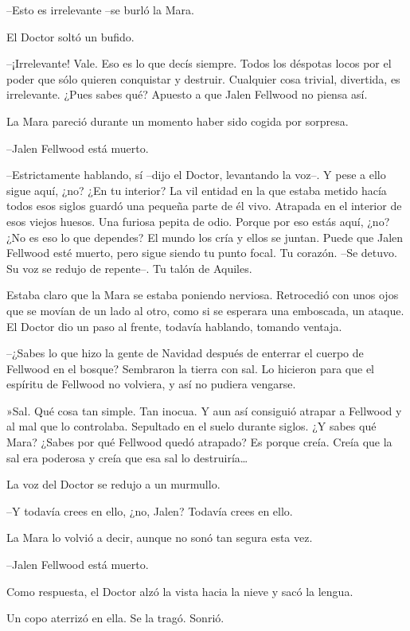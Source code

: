 --Esto es irrelevante --se burló la Mara.

El Doctor soltó un bufido.

--¡Irrelevante! Vale. Eso es lo que decís siempre. Todos los déspotas locos por el poder que sólo quieren conquistar y destruir. Cualquier cosa trivial, divertida, es irrelevante. ¿Pues sabes qué? Apuesto a que Jalen Fellwood no piensa así.

La Mara pareció durante un momento haber sido cogida por sorpresa.

--Jalen Fellwood está muerto.

--Estrictamente hablando, sí --dijo el Doctor, levantando la voz--. Y pese a ello sigue aquí, ¿no? ¿En tu interior? La vil entidad en la que estaba metido hacía todos esos siglos guardó una pequeña parte de él vivo. Atrapada en el interior de esos viejos huesos. Una furiosa pepita de odio. Porque por eso estás aquí, ¿no? ¿No es eso lo que dependes? El mundo los cría y ellos se juntan. Puede que Jalen Fellwood esté muerto, pero sigue siendo tu punto focal. Tu corazón. --Se detuvo. Su voz se redujo de repente--. Tu talón de Aquiles.

Estaba claro que la Mara se estaba poniendo nerviosa. Retrocedió con unos ojos que se movían de un lado al otro, como si se esperara una emboscada, un ataque. El Doctor dio un paso al frente, todavía hablando, tomando ventaja.

--¿Sabes lo que hizo la gente de Navidad después de enterrar el cuerpo de Fellwood en el bosque? Sembraron la tierra con sal. Lo hicieron para que el espíritu de Fellwood no volviera, y así no pudiera vengarse.

»Sal. Qué cosa tan simple. Tan inocua. Y aun así consiguió atrapar a Fellwood y al mal que lo controlaba. Sepultado en el suelo durante siglos. ¿Y sabes qué Mara? ¿Sabes por qué Fellwood quedó atrapado? Es porque creía. Creía que la sal era poderosa y creía que esa sal lo destruiría…

La voz del Doctor se redujo a un murmullo.

--Y todavía crees en ello, ¿no, Jalen? Todavía crees en ello.

La Mara lo volvió a decir, aunque no sonó tan segura esta vez.

--Jalen Fellwood está muerto.

Como respuesta, el Doctor alzó la vista hacia la nieve y sacó la lengua.

Un copo aterrizó en ella. Se la tragó. Sonrió.

